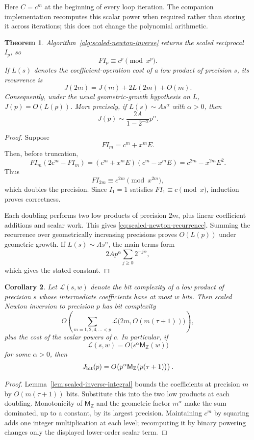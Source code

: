 \documentclass[11pt]{book}
\newtheorem{theorem}{Theorem}[section]
\newtheorem{corollary}[theorem]{Corollary}
\theoremstyle{definition}
\newcommand{\ZZ}{\mathbb Z}
\newcommand{\MZ}{\mathsf M_{\ZZ}}
\begin{document}
Here $C=c^m$ at the beginning of every loop iteration.  The companion
implementation recomputes this scalar power when required rather than storing
it across iterations; this does not change the polynomial arithmetic.

\begin{theorem}\label{thm:scaled-newton-correctness}
Algorithm~\ref{alg:scaled-newton-inverse} returns the scaled reciprocal $I_p$,
so
\[
 FI_p\equiv c^p\pmod{x^p}.
\]
If $L(s)$ denotes the coefficient-operation cost of a low product of precision
$s$, its recurrence is
\begin{equation}\label{eq:scaled-newton-recurrence}
 J(2m)=J(m)+2L(2m)+O(m).
\end{equation}
Consequently, under the usual geometric-growth hypothesis on $L$,
$J(p)=O(L(p))$.  More precisely, if
$L(s)\sim A s^\alpha$ with $\alpha>0$, then
\[
 J(p)\sim\frac{2A}{1-2^{-\alpha}}p^\alpha.
\]
\end{theorem}

\begin{proof}
Suppose
\[
 FI_m=c^m+x^mE.
\]
Then, before truncation,
\[
 F I_m(2c^m-FI_m)
 =(c^m+x^mE)(c^m-x^mE)
 =c^{2m}-x^{2m}E^2.
\]
Thus
\[
 FI_{2m}\equiv c^{2m}\pmod{x^{2m}},
\]
which doubles the precision.  Since $I_1=1$ satisfies
$FI_1\equiv c\pmod{x}$, induction proves correctness.

Each doubling performs two low products of precision $2m$, plus linear
coefficient additions and scalar work.  This gives
\eqref{eq:scaled-newton-recurrence}.  Summing the recurrence over geometrically
increasing precisions proves $O(L(p))$ under geometric growth.  If
$L(s)\sim As^\alpha$, the main terms form
\[
 2Ap^\alpha\sum_{j\ge0}2^{-j\alpha},
\]
which gives the stated constant.
\end{proof}

\begin{corollary}\label{cor:scaled-newton-bit}
Let $\mathcal L(s,w)$ denote the bit complexity of a low product of precision
$s$ whose intermediate coefficients have at most $w$ bits.  Then scaled
Newton inversion to precision $p$ has bit complexity
\[
 O\!\left(
 \sum_{m=1,2,4,\ldots<p}
 \mathcal L\bigl(2m,O(m(\tau+1))\bigr)
 \right),
\]
plus the cost of the scalar powers of $c$.  In particular, if
\[
 \mathcal L(s,w)=O\bigl(s^\alpha\MZ(w)\bigr)
\]
for some $\alpha>0$, then
\[
 J_{\rm bit}(p)
 =O\!\left(p^\alpha\MZ\bigl(p(\tau+1)\bigr)\right).
\]
\end{corollary}

\begin{proof}
Lemma~\ref{lem:scaled-inverse-integral} bounds the coefficients at precision
$m$ by $O(m(\tau+1))$ bits.  Substitute this into the two low products at each
doubling.  Monotonicity of $\MZ$ and the geometric factor $m^\alpha$ make the
sum dominated, up to a constant, by its largest precision.  Maintaining
$c^m$ by squaring adds one integer multiplication at each level; recomputing
it by binary powering changes only the displayed lower-order scalar term.
\end{proof}
\end{document}
